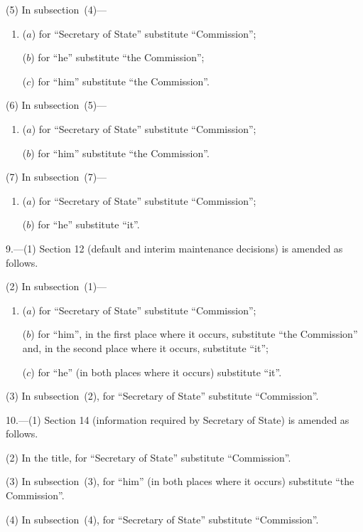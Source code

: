 \documentclass[12pt,a4paper]{article}
\begin{document}
(5) In subsection~(4)—
\begin{enumerate}\item[]
($a$) for “Secretary of State” substitute “Commission”;

($b$) for “he” substitute “the Commission”;

($c$) for “him” substitute “the Commission”.
\end{enumerate}

(6) In subsection~(5)—
\begin{enumerate}\item[]
($a$) for “Secretary of State” substitute “Commission”;

($b$) for “him” substitute “the Commission”.
\end{enumerate}

(7) In subsection~(7)—
\begin{enumerate}\item[]
($a$) for “Secretary of State” substitute “Commission”;

($b$) for “he” substitute “it”.
\end{enumerate}

\medskip

9.---(1) Section 12 (default and interim maintenance decisions) is amended as follows.

(2) In subsection~(1)—
\begin{enumerate}\item[]
($a$) for “Secretary of State” substitute “Commission”;

($b$) for “him”, in the first place where it occurs, substitute “the Commission” and, in the second place where it occurs, substitute “it”;

($c$) for “he” (in both places where it occurs) substitute “it”.
\end{enumerate}

(3) In subsection~(2), for “Secretary of State” substitute “Commission”.

\medskip

10.---(1) Section 14 (information required by Secretary of State) is amended as follows.

(2) In the title, for “Secretary of State” substitute “Commission”.

(3) In subsection~(3), for “him” (in both places where it occurs) substitute “the Commission”.

(4) In subsection~(4), for “Secretary of State” substitute “Commission”.

\medskip
\end{document}
